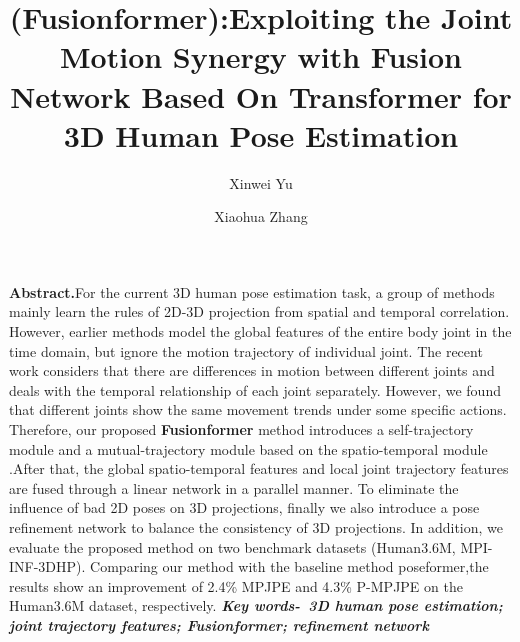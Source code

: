 \documentclass{article}
\title{\LARGE{\textbf{(Fusionformer):Exploiting the Joint Motion Synergy with Fusion Network Based On Transformer for 3D Human Pose Estimation}}}
\author[*]{Xinwei Yu}
\author[**]{Xiaohua Zhang}
\affil[*]{Hangzhou Research Institute, Xidian University}
\affil[**]{Xidian University}
\date{}
\begin{document}
\maketitle

\textbf{Abstract.}For the current 3D human pose estimation task, a group of methods mainly learn the rules of 2D-3D projection from spatial and temporal correlation. However, earlier methods model the global features of the entire body joint in the time domain, but ignore the motion trajectory of individual joint. The recent work \cite{zhang2022mixste} considers that there are differences in motion between different joints and deals with the temporal relationship of each joint separately. However, we found that different joints show the same movement trends under some specific actions. Therefore, our proposed  \textbf{Fusionformer} method introduces a self-trajectory module and a mutual-trajectory module based on the spatio-temporal module .After that, the global spatio-temporal features and local joint trajectory features are fused through a linear network in a parallel manner. To eliminate the influence of bad 2D poses on 3D projections, finally we also introduce a pose refinement network to balance the consistency of 3D projections. In addition, we evaluate the proposed method on two benchmark datasets (Human3.6M, MPI-INF-3DHP). Comparing our method with the baseline method poseformer,the results show an improvement of 2.4\% MPJPE and 4.3\% P-MPJPE on the Human3.6M dataset, respectively.
{\bf\emph{ Key words-\ 3D human pose estimation; joint trajectory features; Fusionformer; refinement network}\rm}
\end{document}
